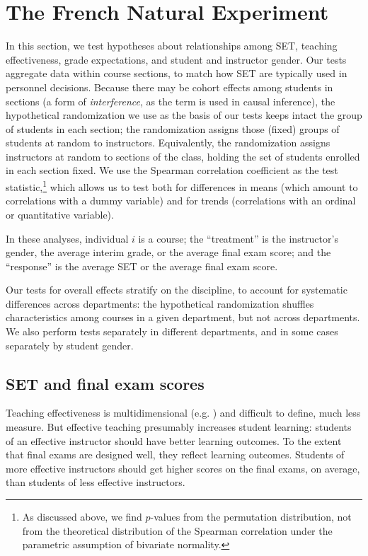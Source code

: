 \documentclass[12pt]{article}
\begin{document}
\section{The French Natural Experiment}
In this section, we test hypotheses about relationships among
SET, teaching effectiveness, grade expectations, and student and instructor gender.
Our tests aggregate data within course sections, to match how SET are typically
used in personnel decisions. 
Because there may be cohort effects among students in sections (a form of
\emph{interference}, as the term is used in causal inference), the hypothetical randomization we
use as the basis of our tests keeps intact the group of students in each section;
the randomization assigns those (fixed) groups of students at random to instructors.
Equivalently, the randomization assigns instructors at random to sections of the class,
holding the set of students enrolled in each section fixed.
We use the Spearman correlation coefficient as the test statistic,\footnote{%
As discussed above, we find $p$-values from the permutation distribution, not from
the theoretical distribution of the Spearman correlation 
under the parametric assumption of bivariate normality.
} 
which allows us to test both for 
differences in means (which amount to correlations with a dummy variable) and for 
trends (correlations with an ordinal or quantitative variable).

In these analyses, individual $i$ is a course; the ``treatment'' is the instructor's gender, 
the average interim grade, or the average final exam score;
and the ``response'' is the average SET or the average final exam score.

Our tests for overall effects stratify on the discipline, to account for systematic
differences across departments:
the hypothetical randomization shuffles characteristics among courses in a given
department, but not across departments.
We also perform tests separately in different departments, and in some cases separately by
student gender.

\subsection{SET and final exam scores}
Teaching effectiveness is multidimensional (e.g. \citet{Marsh1997}) and difficult to define,
much less measure. 
But effective teaching presumably increases student learning:
students of an effective instructor should have better learning outcomes. 
To the extent that final exams are designed well, they reflect learning outcomes.
Students of more effective instructors should get higher scores on the final exams, on average,
than students of less effective instructors.
\end{document}
